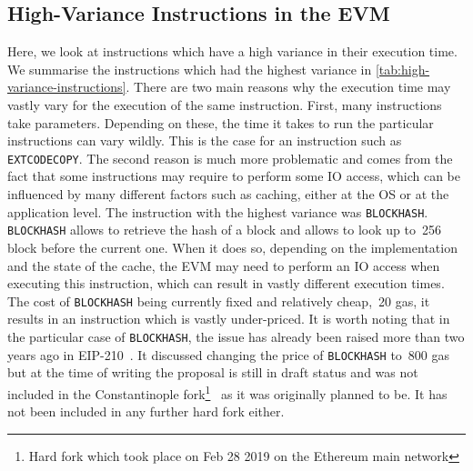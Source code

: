 \subsection{High-Variance Instructions in the EVM}
Here, we look at instructions which have a high variance in their execution time.
We summarise the instructions which had the highest variance in \autoref{tab:high-variance-instructions}.
There are two main reasons why the execution time may vastly vary for the execution of the same instruction.
First, many instructions take parameters.
Depending on these, the time it takes to run the particular instructions can vary wildly.
This is the case for an instruction such as \lstinline{EXTCODECOPY}.
The second reason is much more problematic and comes from the fact that some instructions may require to perform some IO access, which can be influenced by many different factors such as caching, either at the OS or at the application level.
The instruction with the highest variance was \lstinline{BLOCKHASH}.
\lstinline{BLOCKHASH} allows to retrieve the hash of a block and allows to look up to~256 block before the current one.
When it does so, depending on the implementation and the state of the cache, the EVM may need to perform an IO access when executing this instruction, which can result in vastly different execution times.
The cost of \lstinline{BLOCKHASH} being currently fixed and relatively cheap,~20 gas, it results in an instruction which is vastly under-priced. It is worth noting that in the particular case of \lstinline{BLOCKHASH}, the issue has already been raised more than two years ago in EIP-210~\cite{eip-blockhash}.
It discussed changing the price of \lstinline{BLOCKHASH} to~800 gas but at the time of writing the proposal is still in draft status and was not included in the Constantinople fork\footnote{Hard fork which took place on Feb 28 2019 on the Ethereum main network}~\cite{constantinople} as it was originally planned to be.
It has not been included in any further hard fork either.

